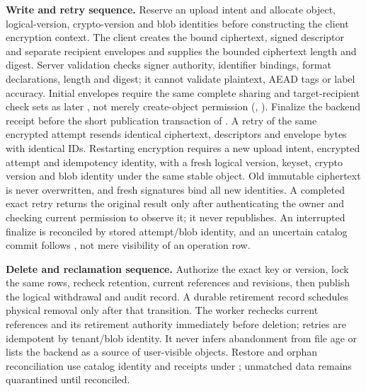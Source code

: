 \textbf{Write and retry sequence.} Reserve an upload intent and allocate object, logical-version, crypto-version and blob identities before constructing the client encryption context. The client creates the bound ciphertext, signed descriptor and separate recipient envelopes and supplies the bounded ciphertext length and digest. Server validation checks signer authority, identifier bindings, format declarations, length and digest; it cannot validate plaintext, AEAD tags or label accuracy. Initial envelopes require the same complete sharing and target-recipient check sets as later , not merely create-object permission (, ). Finalize the backend receipt before the short publication transaction of . A retry of the same encrypted attempt resends identical ciphertext, descriptors and envelope bytes with identical IDs. Restarting encryption requires a new upload intent, encrypted attempt and idempotency identity, with a fresh logical version, keyset, crypto version and blob identity under the same stable object. Old immutable ciphertext is never overwritten, and fresh signatures bind all new identities. A completed exact retry returns the original result only after authenticating the owner and checking current permission to observe it; it never republishes. An interrupted finalize is reconciled by stored attempt/blob identity, and an uncertain catalog commit follows , not mere visibility of an operation row.

\textbf{Delete and reclamation sequence.} Authorize the exact key or version, lock the same rows, recheck retention, current references and revisions, then publish the logical withdrawal and audit record. A durable retirement record schedules physical removal only after that transition. The worker rechecks current references and its retirement authority immediately before deletion; retries are idempotent by tenant/blob identity. It never infers abandonment from file age or lists the backend as a source of user-visible objects. Restore and orphan reconciliation use catalog identity and receipts under ; unmatched data remains quarantined until reconciled.

